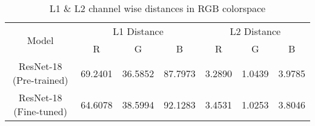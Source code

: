 \begin{table}[!htb]
\setlength{\tabcolsep}{7pt} %
\renewcommand{\arraystretch}{1.5} %
\small
\centering
    \begin{tabular}{c | c c c| c c c}
        \hline
        \hline
        \multirow{2}{*}{Model} & 
            \multicolumn{3}{c|}{L1 Distance} & \multicolumn{3}{c}{L2 Distance}\\
            & R & G & B & R & G & B\\
        \hline
        ResNet-18 (Pre-trained)  & 69.2401 & 36.5852 & 87.7973 & 3.2890 & 1.0439 & 3.9785\\
        ResNet-18 (Fine-tuned) & 64.6078 & 38.5994 & 92.1283 & 3.4531 & 1.0253 & 3.8046\\
        \hline
    \end{tabular}
\caption{L1 \& L2 channel wise distances in RGB colorspace}
\label{tab:rgb_color_results_pre_fine}
\end{table}
